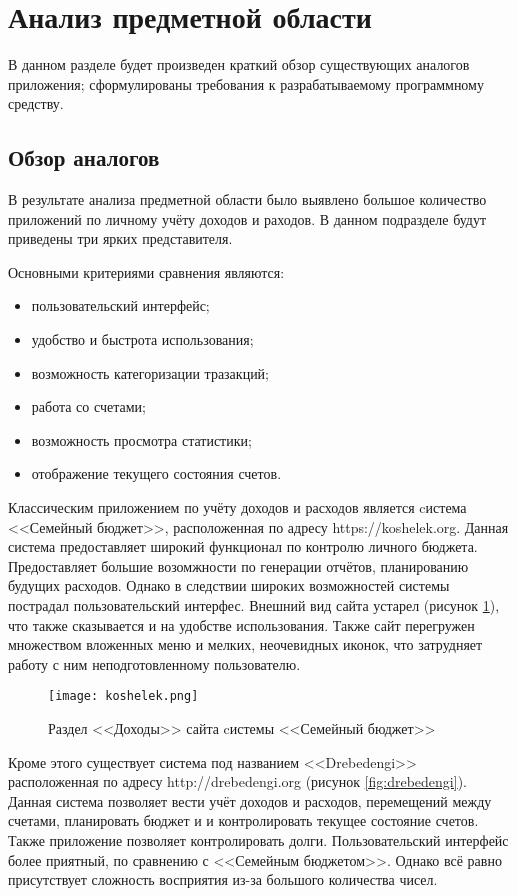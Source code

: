 \section{Анализ предметной области}

В данном разделе будет произведен краткий обзор существующих аналогов приложения; 
сформулированы требования к разрабатываемому программному средству.

\subsection{Обзор аналогов}

В результате анализа предметной области было выявлено большое количество приложений
по личному учёту доходов и раходов.
В данном подразделе будут приведены три ярких представителя.

Основными критериями сравнения являются: 
\begin{itemize}
  \item пользовательский интерфейс;
  \item удобство и быстрота использования;
  \item возможность категоризации тразакций;
  \item работа со счетами;
  \item возможность просмотра статистики;
  \item отображение текущего состояния счетов.
\end{itemize}

Классическим приложением по учёту доходов и расходов является cистема 
<<Семейный бюджет>>, расположенная по адресу https://koshelek.org.
Данная система предоставляет широкий функционал по контролю личного бюджета.
Предоставляет большие возомжности по генерации отчётов, планированию будущих расходов.
Однако в следствии широких возможностей системы пострадал пользовательский интерфес.
Внешний вид сайта устарел (рисунок \ref{fig:koshelek}), что также сказывается и на 
удобстве использования. Также сайт перегружен множеством вложенных меню и мелких, 
неочевидных иконок, что затрудняет работу с ним неподготовленному пользователю.

\begin{figure}[ht] 
\centering
    \texttt{[image: koshelek.png]}
    \caption{Раздел <<Доходы>> сайта cистемы <<Семейный бюджет>>}
  	\label{fig:koshelek}
\end{figure}

Кроме этого существует система под названием <<Drebedengi>> расположенная по адресу
http://drebedengi.org (рисунок \ref{fig:drebedengi}). Данная система позволяет
вести учёт доходов и расходов, перемещений между счетами, планировать бюджет и
и контролировать текущее состояние счетов. Также приложение позволяет 
контролировать долги. Пользовательский интерфейс более приятный, по сравнению с
<<Семейным бюджетом>>. Однако всё равно присутствует сложность восприятия из-за
большого количества чисел.

